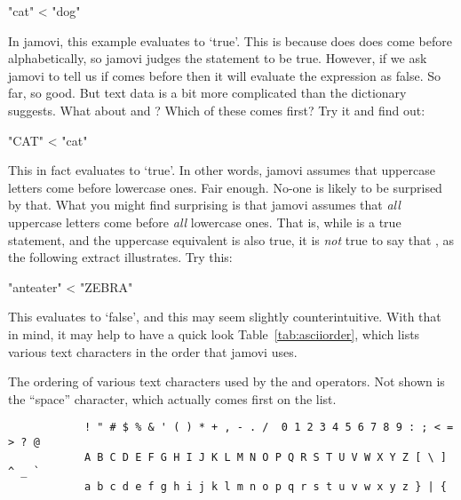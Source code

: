 \begin{rblock1}
"cat" < "dog"
\end{rblock1}

In jamovi, this example evaluates to `true'. This is because  does does come before  alphabetically, so jamovi judges the statement to be true. However, if we ask jamovi to tell us if  comes before  then it will evaluate the expression as false. So far, so good. But text data is a bit more complicated than the dictionary suggests. What about  and ? Which of these comes first? Try it and find out:

\begin{rblock1}
"CAT" < "cat"
\end{rblock1}

This in fact evaluates to `true'. In other words, jamovi assumes that uppercase letters come before lowercase ones. Fair enough. No-one is likely to be surprised by that. What you might find surprising is that jamovi assumes that {\it all} uppercase letters come before {\it all} lowercase ones. That is, while  is a true statement, and the uppercase equivalent  is also true, it is {\it not} true to say that , as the following extract illustrates. Try this: 

\begin{rblock1}
"anteater" < "ZEBRA"
\end{rblock1}

This evaluates to `false', and this may seem slightly counterintuitive. With that in mind, it may help to have a quick look Table~\ref{tab:asciiorder}, which lists various text characters in the order that jamovi uses. 

\begin{table}
\begin{center}
\caption{The ordering of various text characters used by the \rtext{<} and \rtext{>} operators. Not shown is the ``space'' character, which actually comes first on the list.}\tabcapsep
\label{tab:asciiorder}
\begin{verbatim}
            ! " # $ % & ' ( ) * + , - . /  0 1 2 3 4 5 6 7 8 9 : ; < = > ? @ 
            A B C D E F G H I J K L M N O P Q R S T U V W X Y Z [ \ ]  ^ _ ` 
            a b c d e f g h i j k l m n o p q r s t u v w x y z } | {
\end{verbatim}
\HR
\end{center}
\end{table}



